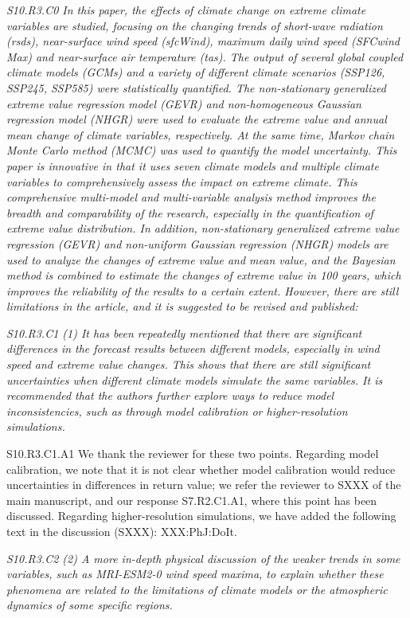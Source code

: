 \documentclass[a4paper,10pt]{article}
\begin{document}
	\emph{S10.R3.C0 In this paper, the effects of climate change on extreme climate variables are studied, focusing on the changing trends of short-wave radiation (rsds), near-surface wind speed (sfcWind), maximum daily wind speed (SFCwind Max) and near-surface air temperature (tas). The output of several global coupled climate models (GCMs) and a variety of different climate scenarios (SSP126, SSP245, SSP585) were statistically quantified. The non-stationary generalized extreme value regression model (GEVR) and non-homogeneous Gaussian regression model (NHGR) were used to evaluate the extreme value and annual mean change of climate variables, respectively. At the same time, Markov chain Monte Carlo method (MCMC) was used to quantify the model uncertainty. This paper is innovative in that it uses seven climate models and multiple climate variables to comprehensively assess the impact on extreme climate. This comprehensive multi-model and multi-variable analysis method improves the breadth and comparability of the research, especially in the quantification of extreme value distribution. In addition, non-stationary generalized extreme value regression (GEVR) and non-uniform Gaussian regression (NHGR) models are used to analyze the changes of extreme value and mean value, and the Bayesian method is combined to estimate the changes of extreme value in 100 years, which improves the reliability of the results to a certain extent. However, there are still limitations in the article, and it is suggested to be revised and published:}

	\emph{S10.R3.C1 (1) It has been repeatedly mentioned that there are significant differences in the forecast results between different models, especially in wind speed and extreme value changes. This shows that there are still significant uncertainties when different climate models simulate the same variables. It is recommended that the authors further explore ways to reduce model inconsistencies, such as through model calibration or higher-resolution simulations.}

	S10.R3.C1.A1 We thank the reviewer for these two points. Regarding model calibration, we note that it is not clear whether model calibration would reduce uncertainties in differences in return value; we refer the reviewer to SXXX of the main manuscript, and our response S7.R2.C1.A1, where this point has been discussed. Regarding higher-resolution simulations, we have added the following text in the discussion (SXXX): XXX:PhJ:DoIt.

	\emph{S10.R3.C2 (2) A more in-depth physical discussion of the weaker trends in some variables, such as MRI-ESM2-0 wind speed maxima, to explain whether these phenomena are related to the limitations of climate models or the atmospheric dynamics of some specific regions.}
\end{document}

